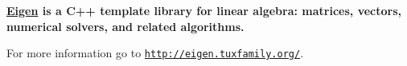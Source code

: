 {\bfseries \hyperlink{namespace_eigen}{Eigen} is a C++ template library for linear algebra\+: matrices, vectors, numerical solvers, and related algorithms.}

For more information go to \href{http://eigen.tuxfamily.org/}{\tt http\+://eigen.\+tuxfamily.\+org/}. 